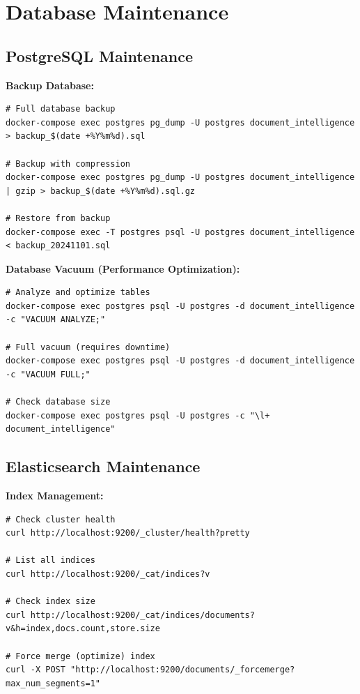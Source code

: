 \section{Database Maintenance}

\subsection{PostgreSQL Maintenance}

\textbf{Backup Database:}
\begin{commandbox}
\begin{lstlisting}[style=bashstyle]
# Full database backup
docker-compose exec postgres pg_dump -U postgres document_intelligence > backup_$(date +%Y%m%d).sql

# Backup with compression
docker-compose exec postgres pg_dump -U postgres document_intelligence | gzip > backup_$(date +%Y%m%d).sql.gz

# Restore from backup
docker-compose exec -T postgres psql -U postgres document_intelligence < backup_20241101.sql
\end{lstlisting}
\end{commandbox}

\textbf{Database Vacuum (Performance Optimization):}
\begin{commandbox}
\begin{lstlisting}[style=bashstyle]
# Analyze and optimize tables
docker-compose exec postgres psql -U postgres -d document_intelligence -c "VACUUM ANALYZE;"

# Full vacuum (requires downtime)
docker-compose exec postgres psql -U postgres -d document_intelligence -c "VACUUM FULL;"

# Check database size
docker-compose exec postgres psql -U postgres -c "\l+ document_intelligence"
\end{lstlisting}
\end{commandbox}

\subsection{Elasticsearch Maintenance}

\textbf{Index Management:}
\begin{commandbox}
\begin{lstlisting}[style=bashstyle]
# Check cluster health
curl http://localhost:9200/_cluster/health?pretty

# List all indices
curl http://localhost:9200/_cat/indices?v

# Check index size
curl http://localhost:9200/_cat/indices/documents?v&h=index,docs.count,store.size

# Force merge (optimize) index
curl -X POST "http://localhost:9200/documents/_forcemerge?max_num_segments=1"
\end{lstlisting}
\end{commandbox}

